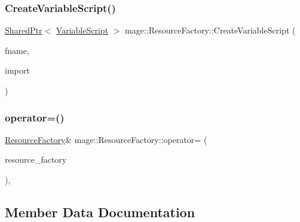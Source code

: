 \hypertarget{classmage_1_1_resource_factory_a523e3f76a3d8347f6d75a7b87a291b1e}{}\label{classmage_1_1_resource_factory_a523e3f76a3d8347f6d75a7b87a291b1e} 
\subsubsection{\texorpdfstring{Create\+Variable\+Script()}{CreateVariableScript()}}
{\footnotesize\ttfamily \hyperlink{namespacemage_a1e01ae66713838a7a67d30e44c67703e}{Shared\+Ptr}$<$ \hyperlink{classmage_1_1_variable_script}{Variable\+Script} $>$ mage\+::\+Resource\+Factory\+::\+Create\+Variable\+Script (\begin{DoxyParamCaption}\item[{const wstring \&}]{fname,  }\item[{bool}]{import }\end{DoxyParamCaption})}

\hypertarget{classmage_1_1_resource_factory_a1a99724dd744fde5ce2a1488966b30d0}{}\label{classmage_1_1_resource_factory_a1a99724dd744fde5ce2a1488966b30d0} 
\subsubsection{\texorpdfstring{operator=()}{operator=()}}
{\footnotesize\ttfamily \hyperlink{classmage_1_1_resource_factory}{Resource\+Factory}\& mage\+::\+Resource\+Factory\+::operator= (\begin{DoxyParamCaption}\item[{const \hyperlink{classmage_1_1_resource_factory}{Resource\+Factory} \&}]{resource\+\_\+factory }\end{DoxyParamCaption})\hspace{0.3cm}{\ttfamily [private]}, {\ttfamily [delete]}}



\subsection{Member Data Documentation}
\hypertarget{classmage_1_1_resource_factory_a1e545bdec29a028ae913761f40d94c4c}{}\label{classmage_1_1_resource_factory_a1e545bdec29a028ae913761f40d94c4c} 
